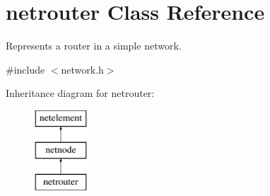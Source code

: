 \hypertarget{classnetrouter}{\section{netrouter Class Reference}
\label{classnetrouter}
}


Represents a router in a simple network.  




{\ttfamily \#include $<$network.\-h$>$}

Inheritance diagram for netrouter\-:\begin{figure}[H]
\begin{center}
\leavevmode
\includegraphics[height=3.000000cm]{classnetrouter}
\end{center}
\end{figure}
